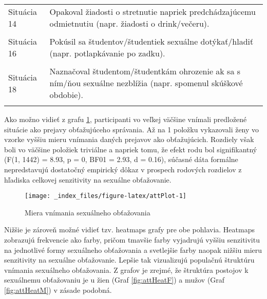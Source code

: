 \documentclass[
]{article}
\begin{document}
\begin{table}[H]
{\begin{tabular}[t]{ll}
Situácia 14 & Opakoval žiadosti o stretnutie napriek predchádzajúcemu odmietnutiu (napr. žiadosti o drink/večeru).\\
\cellcolor{gray!6}{Situácia 15} & \cellcolor{gray!6}{Dotýkal sa študentov/študentiek spôsobom, ktorý v nich vyvolával nepríjemné pocity (napr. ruka cez plecia, okolo pása).}\\
\addlinespace
Situácia 16 & Pokúsil sa študentov/študentiek sexuálne dotýkať/hladiť (napr. potlapkávanie po zadku).\\
\cellcolor{gray!6}{Situácia 17} & \cellcolor{gray!6}{Naznačoval študentom/študentkám výhody za sexuálne zblíženie.}\\
Situácia 18 & Naznačoval študentom/študentkám ohrozenie ak sa s ním/ňou sexuálne nezblížia (napr. spomenul skúškové obdobie).\\
\cellcolor{gray!6}{Situácia 19} & \cellcolor{gray!6}{Vyvolával dojem, že sa mu/jej študenti/študentky musia podriadiť ak chcú, aby s nimi bolo zaobcházané dobre (napr. vyžadoval sexuále zblíženie).}\\
\bottomrule
\end{tabular}}
\end{table}

Ako možno vidieť z grafu \ref{fig:attPlot}, participanti vo veľkej väčšine vnímali predložené situácie ako prejavy obťažujúceho správania. Až na 1 položku vykazovali ženy vo vzorke vyššiu mieru vnímania daných prejavov ako obťažujúcich. Rozdiely však boli vo väčšine položiek triviálne a napriek tomu, že efekt rodu bol signifikantný (F(1, 1442) = 8.93, p = 0, BF01 = 2.93, d = 0.16), súčasné dáta formálne nepredstavujú dostatočný empirický dôkaz v prospech rodových rozdielov z hľadiska celkovej senzitivity na sexuálne obťažovanie.

\begin{figure}

{\centering \texttt{[image: \_index\_files/figure-latex/attPlot-1]} 

}

\caption{Miera vnímania sexuálneho obťažovania}\label{fig:attPlot}
\end{figure}

Nižšie je zároveň možné vidieť tzv. heatmaps grafy pre obe pohlavia. Heatmaps zobrazujú frekvencie ako farby, pričom tmavšie farby vyjadrujú vyššiu senzitivitu na jednotlivé formy sexuálneho obťažovania a svetlejšie farby naopak nižšiu mieru senzitivity na sexuálne obťažovanie. Lepšie tak vizualizujú populačnú štruktúru vnímania sexuálneho obťažovania. Z grafov je zrejmé, že štruktúra postojov k sexuálnemu obťažovaniu je u žien (Graf \ref{fig:attHeatF}) a mužov (Graf \ref{fig:attHeatM}) v zásade podobná.
\end{document}
